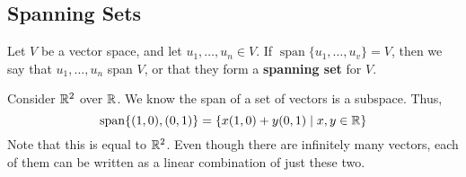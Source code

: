 \documentclass{article}
\DeclareMathOperator{\spn}{span}
\begin{document}
\subsection{Spanning Sets}
\begin{definition}
  Let $V$ be a vector space, and let $u_1, \ldots, u_n \in V$. If $\spn\{u_1, \ldots, u_v\}=V$, then we say that $u_1, \ldots, u_n$ span $V$, or that they form a \textbf{spanning set} for $V$.
\end{definition}
\begin{remark}
  Consider $\mathbb{R}^2$ over $\mathbb{R}$. We know the span of a set of vectors is a subspace. Thus,
  \[
    \spn\{(1, 0), (0, 1)\} = \{x(1, 0) + y(0, 1) \mid x, y \in \R\}
  \]
  Note that this is equal to $\mathbb{R}^2$. Even though there are infinitely many vectors, each of them can be written as a linear combination of just these two.
\end{remark}
\end{document}
